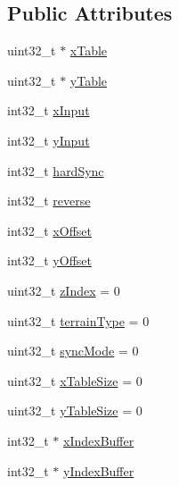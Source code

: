 \subsection*{Public Attributes}
\begin{DoxyCompactItemize}
\item 
uint32\+\_\+t $\ast$ \mbox{\hyperlink{class_three_axis_scanner_a52cba5584884df990e63128f02e52336}{x\+Table}}
\item 
uint32\+\_\+t $\ast$ \mbox{\hyperlink{class_three_axis_scanner_a292e1e41da2aa49d6680c4ec504c25cb}{y\+Table}}
\item 
int32\+\_\+t \mbox{\hyperlink{class_three_axis_scanner_a36d5ebdb169f0a3a8d612cdc3e3a13f0}{x\+Input}}
\item 
int32\+\_\+t \mbox{\hyperlink{class_three_axis_scanner_a8c84dff492c6ebb8d76610eae2150c1f}{y\+Input}}
\item 
int32\+\_\+t \mbox{\hyperlink{class_three_axis_scanner_a3c6c26ad2f1362eba40cda25cf1ff054}{hard\+Sync}}
\item 
int32\+\_\+t \mbox{\hyperlink{class_three_axis_scanner_aeb4f7b49b316534d905c48e7c0bede43}{reverse}}
\item 
int32\+\_\+t \mbox{\hyperlink{class_three_axis_scanner_a877062100b620dd12008464c0e59866d}{x\+Offset}}
\item 
int32\+\_\+t \mbox{\hyperlink{class_three_axis_scanner_ae9056dd10838e243c6f56a6e59850f4f}{y\+Offset}}
\item 
uint32\+\_\+t \mbox{\hyperlink{class_three_axis_scanner_a1e0deccb90209b32e5f8a837137a3aec}{z\+Index}} = 0
\item 
uint32\+\_\+t \mbox{\hyperlink{class_three_axis_scanner_acb5f976017defd8b44532689d98de006}{terrain\+Type}} = 0
\item 
uint32\+\_\+t \mbox{\hyperlink{class_three_axis_scanner_a3e35232961df473f0b7809044caea561}{sync\+Mode}} = 0
\item 
uint32\+\_\+t \mbox{\hyperlink{class_three_axis_scanner_a392fd00e79c8bee282c74f279f514781}{x\+Table\+Size}} = 0
\item 
uint32\+\_\+t \mbox{\hyperlink{class_three_axis_scanner_a774c001a0a47d99fc1139edac12dd234}{y\+Table\+Size}} = 0
\item 
int32\+\_\+t $\ast$ \mbox{\hyperlink{class_three_axis_scanner_a72eb33f11bfbb80c7fc6fe159a8b735e}{x\+Index\+Buffer}}
\item 
int32\+\_\+t $\ast$ \mbox{\hyperlink{class_three_axis_scanner_a0d0cec10e4860da556540f60c18c2981}{y\+Index\+Buffer}}
\item 

\end{DoxyCompactItemize}
